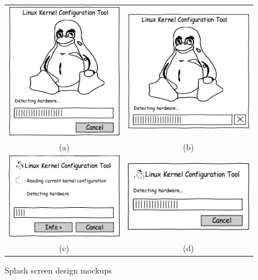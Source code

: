 \documentclass{chi2009}
\begin{document}
\begin{figure}[!t]
 \centering
\begin{tabular}{SS}
 \includegraphics[scale=0.5,keepaspectratio=true]{figs/splash-big.png} & \includegraphics[scale=0.5,keepaspectratio=true]{figs/splash-bigico.png} \\
 (a) & (b) \\
 \includegraphics[scale=0.5,keepaspectratio=true]{figs/splash-readingcurrent.png} &
 \includegraphics[scale=0.5,keepaspectratio=true]{figs/splash-standard.png} \\
 (c) & (d) \\
\end{tabular}
\caption{Splash screen design mockups}
\label{fig:splash}
\end{figure}
\end{document}
